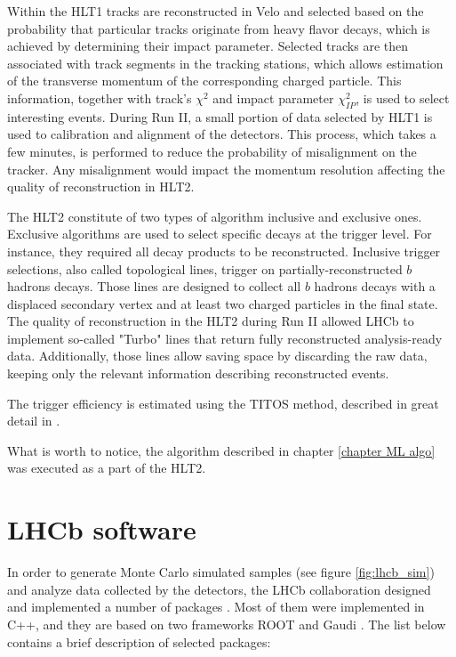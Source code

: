 Within the HLT1 tracks are reconstructed in Velo and selected based on the probability that particular tracks originate from heavy flavor decays, which is achieved by determining their impact parameter. Selected tracks are then associated with track segments in the tracking stations, which allows estimation of the transverse momentum of the corresponding charged particle. This information, together with track's $\chi^2$ and impact parameter $\chi^2_{IP}$, is used to select interesting events.  
During Run II, a small portion of data selected by HLT1 is used to calibration and alignment of the detectors. This process, which takes a few minutes, is performed to reduce the probability of misalignment on the tracker. Any misalignment would impact the momentum resolution affecting the quality of reconstruction in HLT2. 

The HLT2 constitute of two types of algorithm inclusive and exclusive ones. Exclusive algorithms are used to select specific decays at the trigger level. For instance, they required all decay products to be reconstructed. 
Inclusive trigger selections, also called topological lines, trigger on partially-reconstructed $b$ hadrons decays. Those lines are designed to collect all $b$ hadrons decays with a displaced secondary vertex and at least two charged particles in the final state.
The quality of reconstruction in the HLT2 during Run II allowed LHCb to implement so-called "Turbo" lines that return fully reconstructed analysis-ready data. Additionally, those lines allow saving space by discarding the raw data, keeping only the relevant information describing reconstructed events. 

The trigger efficiency is estimated using the TITOS method, described in great detail in \cite{trigger_eff}. 

What is worth to notice, the algorithm described in chapter \ref{chapter ML algo} was executed as a part of the HLT2. 

\section{LHCb software}

In order to generate Monte Carlo simulated samples (see figure \ref{fig:lhcb_sim}) and analyze data collected by the detectors, the LHCb collaboration designed and implemented a number of packages \cite{lhcb_software}. Most of them were implemented in  C++, and they are based on two frameworks ROOT \cite{root} and Gaudi \cite{gaudi}. The list below contains a brief description of selected packages:

